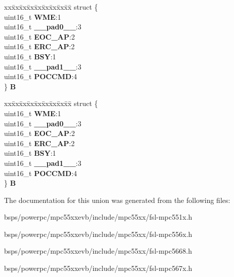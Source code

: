 \begin{DoxyCompactItemize}
\begin{tabbing}
\end{tabbing}\item 
\mbox{\label{unionuPOCR_a5a567443479b87b923f9903381d11ea6}} 
\begin{tabbing}
xx\=xx\=xx\=xx\=xx\=xx\=xx\=xx\=xx\=\kill
struct \{\\
\>uint16\_t {\bfseries WME}:1\\
\>uint16\_t {\bfseries \_\_pad0\_\_}:3\\
\>uint16\_t {\bfseries EOC\_AP}:2\\
\>uint16\_t {\bfseries ERC\_AP}:2\\
\>uint16\_t {\bfseries BSY}:1\\
\>uint16\_t {\bfseries \_\_pad1\_\_}:3\\
\>uint16\_t {\bfseries POCCMD}:4\\
\} {\bfseries B}\\

\end{tabbing}\item 
\mbox{\label{unionuPOCR_a440f7bed496da07d83fdb0a5ba826c60}} 
\begin{tabbing}
xx\=xx\=xx\=xx\=xx\=xx\=xx\=xx\=xx\=\kill
struct \{\\
\>uint16\_t {\bfseries WME}:1\\
\>uint16\_t {\bfseries \_\_pad0\_\_}:3\\
\>uint16\_t {\bfseries EOC\_AP}:2\\
\>uint16\_t {\bfseries ERC\_AP}:2\\
\>uint16\_t {\bfseries BSY}:1\\
\>uint16\_t {\bfseries \_\_pad1\_\_}:3\\
\>uint16\_t {\bfseries POCCMD}:4\\
\} {\bfseries B}\\

\end{tabbing}\end{DoxyCompactItemize}


The documentation for this union was generated from the following files\+:\begin{DoxyCompactItemize}
\item 
bsps/powerpc/mpc55xxevb/include/mpc55xx/fsl-\/mpc551x.\+h\item 
bsps/powerpc/mpc55xxevb/include/mpc55xx/fsl-\/mpc556x.\+h\item 
bsps/powerpc/mpc55xxevb/include/mpc55xx/fsl-\/mpc5668.\+h\item 
bsps/powerpc/mpc55xxevb/include/mpc55xx/fsl-\/mpc567x.\+h\end{DoxyCompactItemize}
